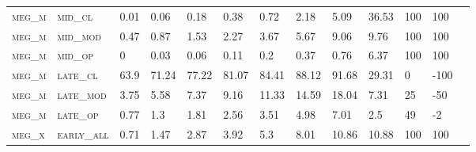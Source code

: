 \begin{sidewaystable}[!htbp]
\begin{tabular}{@{}lllllllllllll@{}}
\footnotesize \textsc{meg\_m}      & \footnotesize \textsc{mid\_cl   }                & \footnotesize 0.01            & \footnotesize 0.06            & \footnotesize 0.18             & \footnotesize 0.38             & \footnotesize 0.72             & \footnotesize 2.18             & \footnotesize 5.09       & \footnotesize 36.53    & \footnotesize 100    & \footnotesize 100      \\
\footnotesize \textsc{meg\_m}      & \footnotesize \textsc{mid\_mod  }                & \footnotesize 0.47            & \footnotesize 0.87            & \footnotesize 1.53             & \footnotesize 2.27             & \footnotesize 3.67             & \footnotesize 5.67             & \footnotesize 9.06       & \footnotesize 9.76     & \footnotesize 100    & \footnotesize 100      \\
\footnotesize \textsc{meg\_m}      & \footnotesize \textsc{mid\_op   }                & \footnotesize 0               & \footnotesize 0.03            & \footnotesize 0.06             & \footnotesize 0.11             & \footnotesize 0.2              & \footnotesize 0.37             & \footnotesize 0.76       & \footnotesize 6.37     & \footnotesize 100    & \footnotesize 100      \\
\footnotesize \textsc{meg\_m}      & \footnotesize \textsc{late\_cl  }                & \footnotesize 63.9            & \footnotesize 71.24           & \footnotesize 77.22            & \footnotesize 81.07            & \footnotesize 84.41            & \footnotesize 88.12            & \footnotesize 91.68      & \footnotesize 29.31    & \footnotesize 0      & \footnotesize -100     \\
\footnotesize \textsc{meg\_m}      & \footnotesize \textsc{late\_mod }                & \footnotesize 3.75            & \footnotesize 5.58            & \footnotesize 7.37             & \footnotesize 9.16             & \footnotesize 11.33            & \footnotesize 14.59            & \footnotesize 18.04      & \footnotesize 7.31     & \footnotesize 25     & \footnotesize -50      \\
\footnotesize \textsc{meg\_m}      & \footnotesize \textsc{late\_op  }                & \footnotesize 0.77            & \footnotesize 1.3             & \footnotesize 1.81             & \footnotesize 2.56             & \footnotesize 3.51             & \footnotesize 4.98             & \footnotesize 7.01       & \footnotesize 2.5      & \footnotesize 49     & \footnotesize -2       \\
\footnotesize \textsc{meg\_x}      & \footnotesize \textsc{early\_all}                & \footnotesize 0.71            & \footnotesize 1.47            & \footnotesize 2.87             & \footnotesize 3.92             & \footnotesize 5.3              & \footnotesize 8.01             & \footnotesize 10.86      & \footnotesize 10.88    & \footnotesize 100    & \footnotesize 100      \\

\end{tabular}
\end{sidewaystable}
